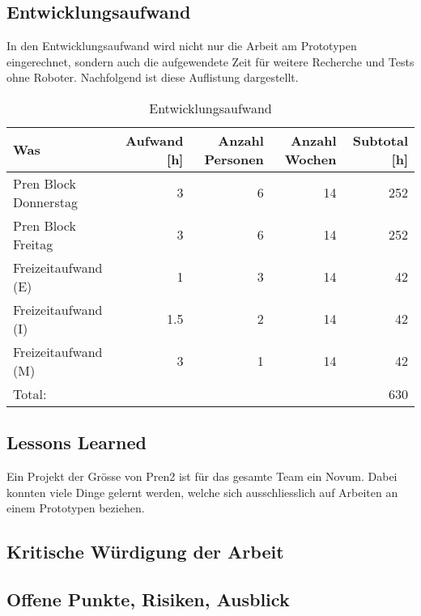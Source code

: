 \newpage

\subsection{Entwicklungsaufwand}

In den Entwicklungsaufwand wird nicht nur die Arbeit am Prototypen eingerechnet, sondern auch die aufgewendete Zeit für weitere Recherche und Tests ohne Roboter.
Nachfolgend ist diese Auflistung dargestellt.

\begin{center}
\begin{table}[H]
\begin{tabular}{|l|r|r|r|r|}
\hline
\textbf {Was} & \textbf{Aufwand [h]} &
\textbf{Anzahl Personen} & \textbf{Anzahl Wochen} & \textbf{Subtotal [h]}\\
\hline
Pren Block Donnerstag & 3 & 6 & 14 & 252 \\
\hline
Pren Block Freitag & 3 & 6 & 14 & 252 \\
\hline
Freizeitaufwand (E) & 1 & 3 & 14 & 42 \\
\hline
Freizeitaufwand (I) & 1.5 & 2 & 14 & 42 \\
\hline
Freizeitaufwand (M) & 3 & 1 & 14 & 42 \\
\hline
Total: & & & & 630 \\ \hline
\end{tabular}
\caption[Entwicklungsaufwand]{Entwicklungsaufwand}
\label{tab:entwicklungsaufwand}
\end{table}
\end{center}

\subsection{Lessons Learned}

Ein Projekt der Grösse von Pren2 ist für das gesamte Team ein Novum. Dabei konnten viele Dinge gelernt werden, welche sich ausschliesslich auf Arbeiten an einem Prototypen beziehen.




\subsection{Kritische Würdigung der Arbeit}




\subsection{Offene Punkte, Risiken, Ausblick}

